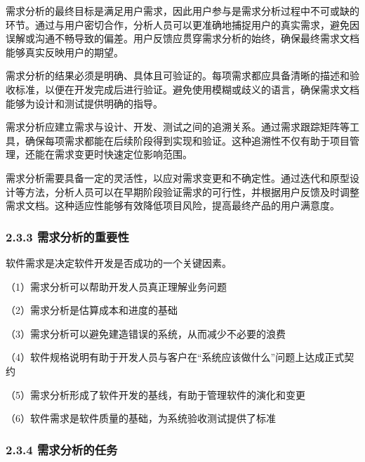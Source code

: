 
需求分析的最终目标是满足用户需求，因此用户参与是需求分析过程中不可或缺的环节。通过与用户密切合作，分析人员可以更准确地捕捉用户的真实需求，避免因误解或沟通不畅导致的偏差。用户反馈应贯穿需求分析的始终，确保最终需求文档能够真实反映用户的期望。


需求分析的结果必须是明确、具体且可验证的。每项需求都应具备清晰的描述和验收标准，以便在开发完成后进行验证。避免使用模糊或歧义的语言，确保需求文档能够为设计和测试提供明确的指导。


需求分析应建立需求与设计、开发、测试之间的追溯关系。通过需求跟踪矩阵等工具，确保每项需求都能在后续阶段得到实现和验证。这种追溯性不仅有助于项目管理，还能在需求变更时快速定位影响范围。


需求分析需要具备一定的灵活性，以应对需求变更和不确定性。通过迭代和原型设计等方法，分析人员可以在早期阶段验证需求的可行性，并根据用户反馈及时调整需求文档。这种适应性能够有效降低项目风险，提高最终产品的用户满意度。

\hypertarget{ux9700ux6c42ux5206ux6790ux7684ux91cdux8981ux6027}{%
\subsubsection{2.3.3 需求分析的重要性}\label{ux9700ux6c42ux5206ux6790ux7684ux91cdux8981ux6027}}

软件需求是决定软件开发是否成功的一个关键因素。

（1）需求分析可以帮助开发人员真正理解业务问题

（2）需求分析是估算成本和进度的基础

（3）需求分析可以避免建造错误的系统，从而减少不必要的浪费

（4）软件规格说明有助于开发人员与客户在``系统应该做什么''问题上达成正式契约

（5）需求分析形成了软件开发的基线，有助于管理软件的演化和变更

（6）软件需求是软件质量的基础，为系统验收测试提供了标准

\hypertarget{ux9700ux6c42ux5206ux6790ux7684ux4efbux52a1}{%
\subsubsection{2.3.4 需求分析的任务}\label{ux9700ux6c42ux5206ux6790ux7684ux4efbux52a1}}

